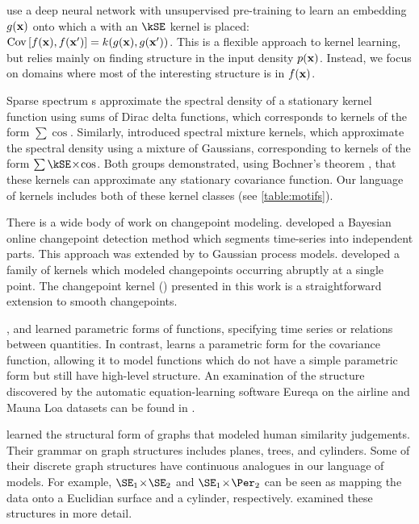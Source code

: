 \citet{salakhutdinov2008using} use a deep neural network with unsupervised pre-training to learn an embedding $g({\bf{x}})$ onto which a \gp{} with an $\kSE$ kernel is placed: ${\operatorname{Cov}{[f({\bf{x}}), f({\bf{x}}')]} = k(g({\bf{x}}), g({\bf{x}}'))}$.
This is a flexible approach to kernel learning, but relies mainly on finding structure in the input density $p({\bf{x}})$.
Instead, we focus on domains where most of the interesting structure is in $f({\bf{x}})$.

Sparse spectrum \gp{}s \citep{lazaro2010sparse} approximate the spectral density of a stationary kernel function using sums of Dirac delta functions, which corresponds to kernels of the form $\sum \cos$.
Similarly, \citet{WilAda13} introduced spectral mixture kernels, which approximate the spectral density using a mixture of Gaussians, corresponding to kernels of the form $\sum \kSE \kerntimes \cos$.
Both groups demonstrated, using Bochner's theorem \citep{bochner1959lectures}, that these kernels can approximate any stationary covariance function.
Our language of kernels includes both of these kernel classes (see \cref{table:motifs}).



There is a wide body of work on changepoint modeling.
\citet{adams2007bayesian} developed a Bayesian online changepoint detection method which segments time-series into independent parts.
This approach was extended by \citet{saatcci2010gaussian} to Gaussian process models.
\citet{garnett2010sequential} developed a family of kernels which modeled changepoints occurring abruptly at a single point.
The changepoint kernel (\kCP) presented in this work is a straightforward extension to smooth changepoints.


\cite{todorovski1997declarative}, \cite{washio1999discovering} and \cite{Schmidt2009b} learned parametric forms of functions, specifying time series or relations between quantities.
In contrast, \procedurename{} learns a parametric form for the covariance function, allowing it to model functions which do not have a simple parametric form but still have high-level structure.
An examination of the structure discovered by the automatic equation-learning software Eureqa \citep{Eureqa} on the airline and Mauna Loa datasets can be found in \citet{LloDuvGroetal14}.




\citet{kemp2008discovery} learned the structural form of graphs that modeled human similarity judgements.
Their grammar on graph structures includes planes, trees, and cylinders.
Some of their discrete graph structures have continuous analogues in our language of models.
For example, $\SE_1 \kerntimes \SE_2$ and $\SE_1 \kerntimes \Per_2$ can be seen as mapping the data onto a Euclidian surface and a cylinder, respectively.
 examined these structures in more detail.

